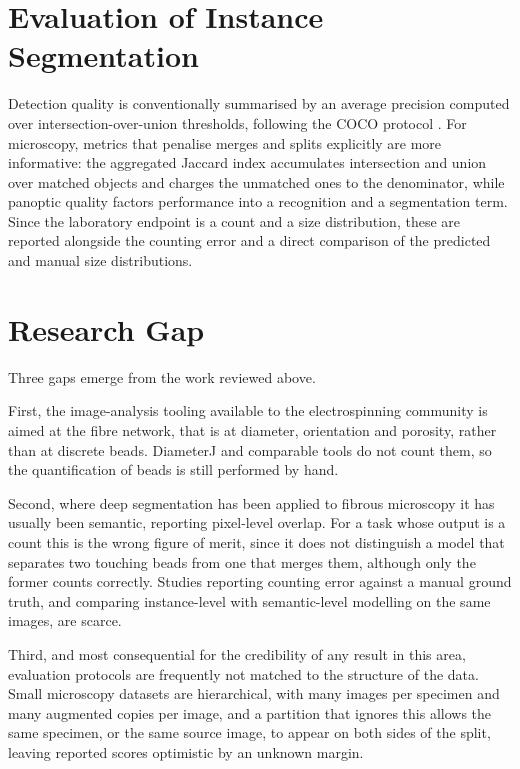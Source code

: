 \section{Evaluation of Instance Segmentation}

Detection quality is conventionally summarised by an average precision computed
over intersection-over-union thresholds, following the COCO protocol
\cite{lin2014microsoft}. For microscopy, metrics that penalise merges and splits
explicitly are more informative: the aggregated Jaccard index
\cite{kumar2017dataset} accumulates intersection and union over matched objects
and charges the unmatched ones to the denominator, while panoptic quality
\cite{kirillov2019panoptic} factors performance into a recognition and a
segmentation term. Since the laboratory endpoint is a count and a size
distribution, these are reported alongside the counting error and a direct
comparison of the predicted and manual size distributions.

\section{Research Gap}

Three gaps emerge from the work reviewed above.

First, the image-analysis tooling available to the electrospinning community is
aimed at the fibre network, that is at diameter, orientation and porosity, rather
than at discrete beads. DiameterJ and comparable tools do not count them, so
the quantification of beads is still performed by hand.

Second, where deep segmentation has been applied to fibrous microscopy it has
usually been semantic, reporting pixel-level overlap. For a task whose output is a
count this is the wrong figure of merit, since it does not distinguish a model
that separates two touching beads from one that merges them, although only the
former counts correctly. Studies reporting counting error against a manual ground
truth, and comparing instance-level with semantic-level modelling on the same
images, are scarce.

Third, and most consequential for the credibility of any result in this area,
evaluation protocols are frequently not matched to the structure of the data.
Small microscopy datasets are hierarchical, with many images per specimen and many
augmented copies per image, and a partition that ignores this allows the same
specimen, or the same source image, to appear on both sides of the split, leaving
reported scores optimistic by an unknown margin.

